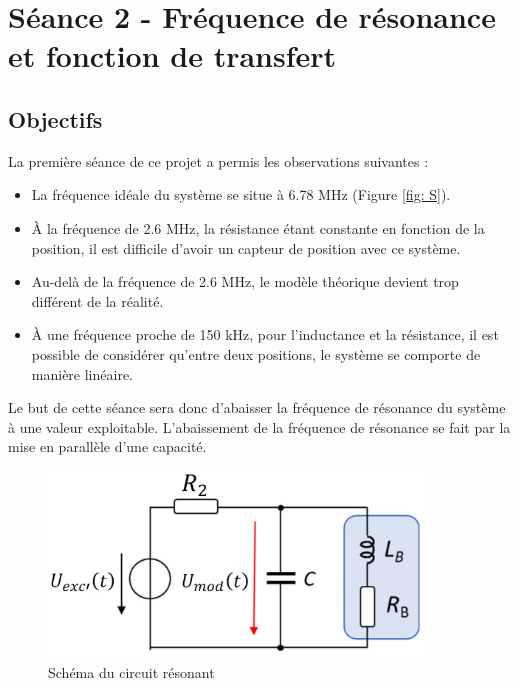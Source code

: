 

\section{Séance 2 - Fréquence de résonance et fonction de transfert}


\subsection{Objectifs}
La première séance de ce projet a permis les observations suivantes :
\begin{itemize}
    \item La fréquence idéale du système se situe à 6.78 MHz (Figure \ref{fig: S}).
    \item À la fréquence de 2.6 MHz, la résistance étant constante en fonction de la position,
    il est difficile d'avoir un capteur de position avec ce système.
    \item Au-delà de la fréquence de 2.6 MHz, le modèle théorique devient trop différent de la réalité.
    \item À une fréquence proche de 150 kHz, pour l'inductance et la résistance, il est possible
    de considérer qu'entre deux positions, le système se comporte de manière linéaire.  
\end{itemize}

\vspace{0,2cm}

Le but de cette séance sera donc d'abaisser la fréquence de résonance du système à une valeur
exploitable. L'abaissement de la fréquence de résonance se fait par la mise en parallèle d'une 
capacité.

\begin{figure}[H]
    \centering
    \includegraphics[width=10cm]{Images/Seance2/Circuit_resonant.png}
    \caption{Schéma du circuit résonant}
    \label{fig:circ_res}
\end{figure}
\vspace{0,2cm}


